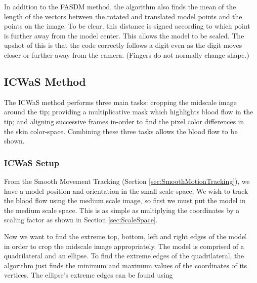 In addition to the FASDM method, the algorithm also finds the mean of the length of the vectors between the rotated and translated model points and the points on the image. To be clear, this distance is signed according to which point is further away from the model center. This allows the model to be scaled. The upshot of this is that the code correctly follows a digit even as the digit moves closer or further away from the camera. (Fingers do not normally change shape.)
\clearpage
\subsection{ICWaS Method}\label{sec:ICWaS}
The ICWaS method performs three main tasks: cropping the midscale image around the tip; providing a multiplicative mask which highlights blood flow in the tip; and aligning successive frames in-order to find the pixel color differences in the skin color-space. Combining these three tasks allows the blood flow to be shown.

\subsubsection{ICWaS Setup}\label{sec:ICWaSSetup}
From the Smooth Movement Tracking (Section \ref{sec:SmoothMotionTracking}), we have a model position and orientation in the small scale space. We wish to track the blood flow using the medium scale image, so first we must put the model in the medium scale space. This is as simple as multiplying the coordinates by a scaling factor as shown in Section \ref{sec:ScaleSpace}.

Now we want to find the extreme top, bottom, left and right edges of the model in order to crop the midscale image appropriately. The model is comprised of a quadrilateral and an ellipse. To find the extreme edges of the quadrilateral, the algorithm just finds the minimum and maximum values of the coordinates of its vertices. The ellipse's extreme edges can be found using

